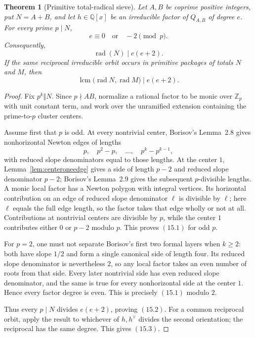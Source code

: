\documentclass[11pt]{article}
\newtheorem{theorem}{Theorem}[section]
\theoremstyle{definition}
\newcommand{\Q}{\mathbb Q}
\newcommand{\Z}{\mathbb Z}
\begin{document}
\begin{theorem}[Primitive total-radical sieve]
\label{thm:radicalsieve}
Let \(A,B\) be coprime positive integers, put \(N=A+B\), and let
\(h\in\Q[x]\) be an irreducible factor of \(Q_{A,B}\) of degree \(e\).
For every prime \(p\mid N\),
\begin{equation}
 e\equiv0\quad\text{or}\quad-2\pmod p.
 \tag{15.1}
\end{equation}
Consequently,
\begin{equation}
 \operatorname{rad}(N)\mid e(e+2).
 \tag{15.2}
\end{equation}
If the same reciprocal irreducible orbit occurs in primitive packages of
totals \(N\) and \(M\), then
\begin{equation}
 \operatorname{lcm}\bigl(\operatorname{rad}N,
                          \operatorname{rad}M\bigr)
 \mid e(e+2).
 \tag{15.3}
\end{equation}
\end{theorem}

\begin{proof}
Fix \(p^k\Vert N\).  Since \(p\nmid AB\), normalize a rational factor to
be monic over \(\Z_p\) with unit constant term, and work over the unramified
extension containing the prime-to-\(p\) cluster centers.

Assume first that \(p\) is odd.  At every nontrivial center, Borisov's
Lemma~2.8 gives nonhorizontal Newton edges of lengths
\[
 p,\quad p^2-p,\quad\ldots,\quad p^k-p^{k-1},
\]
with reduced slope denominators equal to those lengths.  At the center
\(1\), Lemma~\ref{lem:centeroneedge} gives a side of length \(p-2\) and
reduced slope denominator \(p-2\); Borisov's Lemma~2.9 gives the subsequent
\(p\)-divisible lengths.  A monic local
factor has a Newton polygon with integral vertices.  Its horizontal
contribution on an edge of reduced slope denominator \(\ell\) is divisible
by \(\ell\); here \(\ell\) equals the full edge length, so the factor takes
that edge wholly or not at all.  Contributions at nontrivial centers are
divisible by \(p\), while the center \(1\) contributes either \(0\) or
\(p-2\) modulo \(p\).  This proves \((15.1)\) for odd \(p\).

For \(p=2\), one must not separate Borisov's first two formal layers when
\(k\geq2\): both have slope \(1/2\) and form a single canonical side of
length four.  Its reduced slope denominator is nevertheless \(2\), so any
local factor takes an even number of roots from that side.  Every later
nontrivial side has even reduced slope denominator, and the same is true for
every nonhorizontal side at the center \(1\).  Hence every factor degree is
even.  This is precisely \((15.1)\) modulo \(2\).

Thus every \(p\mid N\) divides \(e(e+2)\), proving \((15.2)\).  For a
common reciprocal orbit, apply the result to whichever of \(h,h^\vee\)
divides the second orientation; the reciprocal has the same degree.  This
gives \((15.3)\).
\end{proof}
\end{document}
